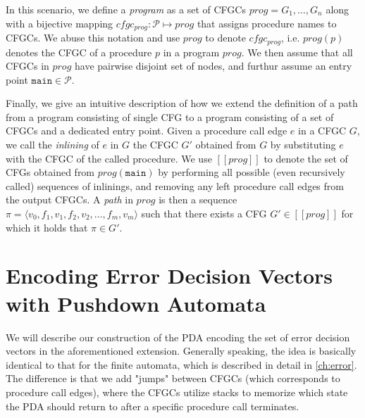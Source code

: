 In this scenario, we define a \emph{program} as a set of CFGCs $prog = {G_1, \dots, G_n}$ along with a bijective mapping $cfgc_{prog} : \mathcal{P} \mapsto prog$ that assigns procedure names to CFGCs. We abuse this notation and use $prog$ to denote $cfgc_{prog}$, i.e. $prog(p)$ denotes the CFGC of a procedure $p$ in a program $prog$. We then assume that all CFGCs in $prog$ have pairwise disjoint set of nodes, and furthur assume an entry point $\mathtt{main} \in \mathcal{P}$. 

Finally, we give an intuitive description of how we extend the definition of a path from a program consisting of single CFG to a program consisting of a set of CFGCs and a dedicated entry point. Given a procedure call edge $e$ in a CFGC $G$, we call the \emph{inlining} of $e$ in $G$ the CFGC $G'$ obtained from $G$ by substituting $e$ with the CFGC of the called procedure. We use $[\![prog]\!]$ to denote the set of CFGs obtained from $prog(\mathtt{main})$ by performing all possible (even recursively called) sequences of inlinings, and removing any left procedure call edges from the output CFGCs. A \emph{path} in $prog$ is then a sequence $\pi = \langle v_0, f_1, v_1, f_2, v_2, \dots , f_m, v_m \rangle$ such that there exists a CFG $G' \in [\![prog]\!]$ for which it holds that $\pi \in G'$. 

\section{Encoding Error Decision Vectors with Pushdown Automata}\label{sec:pda}

We will describe our construction of the PDA encoding the set of error decision vectors in the aforementioned extension. Generally speaking, the idea is basically identical to that for the finite automata, which is described in detail in \ref{ch:error}. The difference is that we add "jumps" between CFGCs (which corresponds to procedure call edges), where the CFGCs utilize stacks to memorize which state the PDA should return to after a specific procedure call terminates. 

